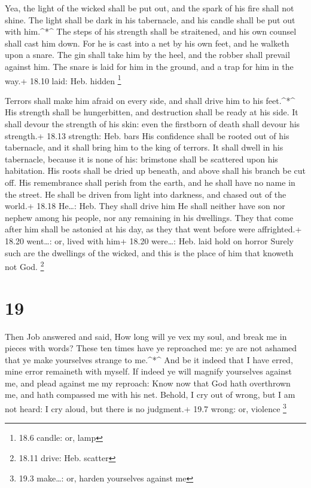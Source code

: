  Yea, the light of the wicked shall be put out, and the
spark of his fire shall not shine.  The light shall be dark
in his tabernacle, and his candle shall be put out with him.\^{}*\^{}
 The steps of his strength shall be straitened, and his own
counsel shall cast him down.  For he is cast into a net by
his own feet, and he walketh upon a snare.  The gin shall
take him by the heel, and the robber shall prevail against him.
 The snare is laid for him in the ground, and a trap for
him in the way.+ 18.10 laid: Heb. hidden \footnote{18.6 candle: or, lamp}

 Terrors shall make him afraid on every side, and shall
drive him to his feet.\^{}*\^{}  His strength shall be
hungerbitten, and destruction shall be ready at his side. 
It shall devour the strength of his skin: even the firstborn of death
shall devour his strength.+ 18.13 strength: Heb. bars  His
confidence shall be rooted out of his tabernacle, and it shall bring him
to the king of terrors.  It shall dwell in his tabernacle,
because it is none of his: brimstone shall be scattered upon his
habitation.  His roots shall be dried up beneath, and above
shall his branch be cut off.  His remembrance shall perish
from the earth, and he shall have no name in the street. 
He shall be driven from light into darkness, and chased out of the
world.+ 18.18 He\ldots: Heb. They shall drive him  He shall
neither have son nor nephew among his people, nor any remaining in his
dwellings.  They that come after him shall be astonied at
his day, as they that went before were affrighted.+ 18.20 went\ldots:
or, lived with him+ 18.20 were\ldots: Heb. laid hold on horror
 Surely such are the dwellings of the wicked, and this is
the place of him that knoweth not God. \footnote{18.11 drive: Heb.
  scatter}

\hypertarget{section-18}{%
\section{19}\label{section-18}}

 Then Job answered and said,  How long will ye
vex my soul, and break me in pieces with words?  These ten
times have ye reproached me: ye are not ashamed that ye make yourselves
strange to me.\^{}*\^{}  And be it indeed that I have erred,
mine error remaineth with myself.  If indeed ye will magnify
yourselves against me, and plead against me my reproach: 
Know now that God hath overthrown me, and hath compassed me with his
net.  Behold, I cry out of wrong, but I am not heard: I cry
aloud, but there is no judgment.+ 19.7 wrong: or, violence \footnote{19.3
  make\ldots: or, harden yourselves against me}

